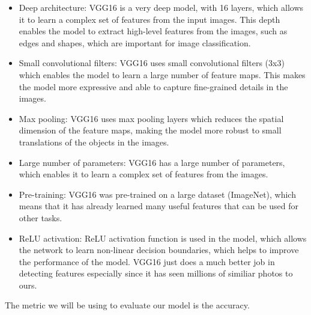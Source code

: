 \documentclass[
  letterpaper,
  DIV=11,
  numbers=noendperiod]{scrartcl}
\begin{document}
\begin{itemize}
\item
  Deep architecture: VGG16 is a very deep model, with 16 layers, which
  allows it to learn a complex set of features from the input images.
  This depth enables the model to extract high-level features from the
  images, such as edges and shapes, which are important for image
  classification.
\item
  Small convolutional filters: VGG16 uses small convolutional filters
  (3x3) which enables the model to learn a large number of feature maps.
  This makes the model more expressive and able to capture fine-grained
  details in the images.
\item
  Max pooling: VGG16 uses max pooling layers which reduces the spatial
  dimension of the feature maps, making the model more robust to small
  translations of the objects in the images.
\item
  Large number of parameters: VGG16 has a large number of parameters,
  which enables it to learn a complex set of features from the images.
\item
  Pre-training: VGG16 was pre-trained on a large dataset (ImageNet),
  which means that it has already learned many useful features that can
  be used for other tasks.
\item
  ReLU activation: ReLU activation function is used in the model, which
  allows the network to learn non-linear decision boundaries, which
  helps to improve the performance of the model. VGG16 just does a much
  better job in detecting features especially since it has seen millions
  of similiar photos to ours.
\end{itemize}

The metric we will be using to evaluate our model is the accuracy.
\end{document}
